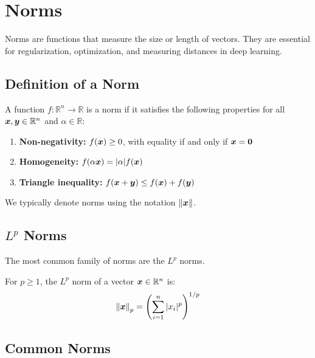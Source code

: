 
\section{Norms }
\label{sec:norms}

Norms are functions that measure the size or length of vectors. They are essential for regularization, optimization, and measuring distances in deep learning.

\subsection{Definition of a Norm}

\begin{definition}[Norm]
A function $f: \mathbb{R}^n \rightarrow \mathbb{R}$ is a norm if it satisfies the following properties for all $\boldsymbol{x}, \boldsymbol{y} \in \mathbb{R}^n$ and $\alpha \in \mathbb{R}$:
\begin{enumerate}
    \item \textbf{Non-negativity:} $f(\boldsymbol{x}) \geq 0$, with equality if and only if $\boldsymbol{x} = \boldsymbol{0}$
    \item \textbf{Homogeneity:} $f(\alpha\boldsymbol{x}) = |\alpha|f(\boldsymbol{x})$
    \item \textbf{Triangle inequality:} $f(\boldsymbol{x} + \boldsymbol{y}) \leq f(\boldsymbol{x}) + f(\boldsymbol{y})$
\end{enumerate}
\end{definition}

We typically denote norms using the notation $\left\lVert\boldsymbol{x}\right\rVert$.

\subsection{$L^p$ Norms}

The most common family of norms are the $L^p$ norms.

\begin{definition}[$L^p$ Norm]
For $p \geq 1$, the $L^p$ norm of a vector $\boldsymbol{x} \in \mathbb{R}^n$ is:
\begin{equation}
    \left\lVert\boldsymbol{x}\right\rVert_p = \left(\sum_{i=1}^{n} |x_i|^p\right)^{1/p}
\end{equation}
\end{definition}

\subsection{Common Norms}

